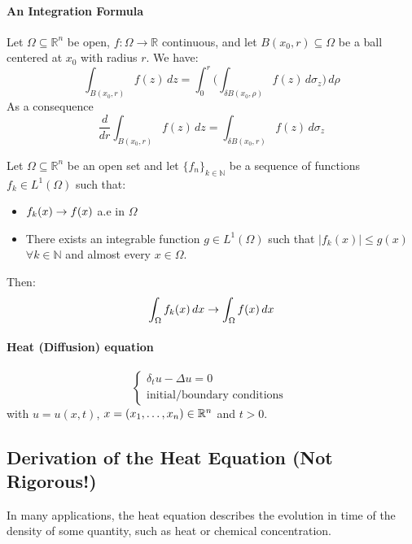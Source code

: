 \paragraph{An Integration Formula}
Let \( \Omega \subseteq \mathbb{R}^n \) be open, \( f: \Omega \to \mathbb{R} \) continuous, and let \( B(x_0, r) \subseteq \Omega \) be a ball centered at \( x_0 \) with radius \( r \). We have:
\[
\int_{B(x_0, r)} f(z) \, dz = \int_0^r\Bigg( \int_{\delta B(x_0, \rho)} f(z) \, d\sigma_z \Bigg) \, d\rho
\]
As a consequence 
\begin{equation*}
    \frac{d}{dr}\int_{B(x_0, r)} f(z) \, dz =  \int_{\delta B(x_0, r)} f(z) \, d\sigma_z 
\end{equation*}
\begin{ThBox}
    \begin{Th}
    Let $\Omega \subseteq \mathbb{R}^n$ be an open set and let \( \{ f_n \}_{k \in \mathbb{N}} \) be a sequence of functions  \( f_k \in  L^1(\Omega) \) such that:
    \begin{itemize}
        \item  \( f_k (x) \rightarrow f(x)\) a.e in $\Omega$
        \item There exists an integrable function \( g \in L^1(\Omega) \) such that \( |f_k(x)| \leq g(x) \) \( \forall k \in \mathbb{N} \) and almost every \( x  \in \Omega\).
    \end{itemize}
Then:
\[
 \int_\Omega f_k(x) \, dx \rightarrow \int_\Omega f(x) \, dx
\]
\end{Th}
\end{ThBox}

\paragraph{Heat (Diffusion) equation}
\begin{equation*}
\begin{cases}
    \delta_t u - \Delta u = 0 \\
    \text{initial/boundary conditions }
\end{cases}    
\end{equation*}
with $u=u(x,t)$, $x=(x_1, \dots, x_n) \in \mathbb{R}^n$ and $t>0$. 
\subsection{Derivation of the Heat Equation (Not Rigorous!)} 
In many applications, the heat equation describes the evolution in time of the density of some quantity, such as heat or chemical concentration.

